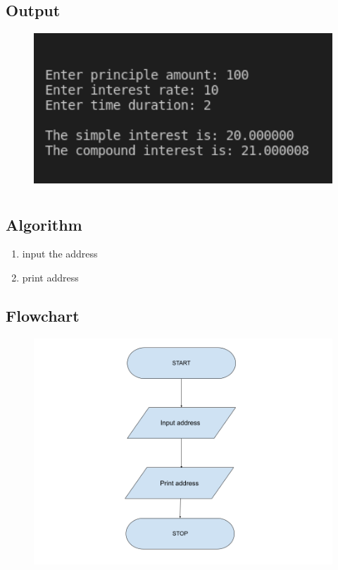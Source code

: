 \documentclass[12pt]{article}
\begin{document}
\subsection{Output}
\begin{figure}[h]
    \centering
    \includegraphics[width=1.0\textwidth]{6.png}
\end{figure}
\newpage
\section{}
\subsection{Algorithm}
\begin{enumerate}
    \item input the address
    \item print address
\end{enumerate}
\subsection{Flowchart}
\begin{figure}[h]
    \centering
    \includegraphics[width=1.0\textwidth]{Flowchart07.png}
\end{figure}
\newpage
\end{document}
